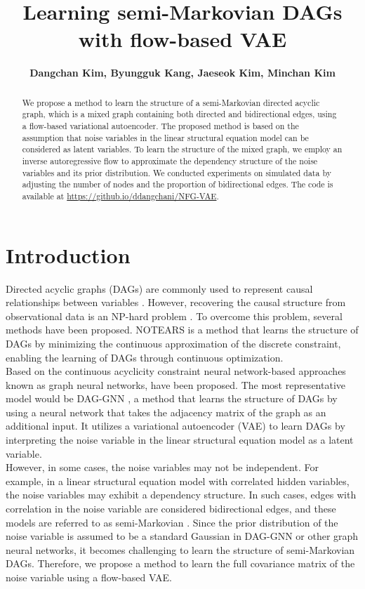 \documentclass[10pt]{article}
\title{
\textbf{Learning semi-Markovian DAGs with flow-based VAE}}
\author{\normalsize\bfseries Dangchan Kim, Byungguk Kang, Jaeseok Kim, Minchan Kim}
\begin{document}
\maketitle

\begin{abstract}
    We propose a method to learn the structure of a semi-Markovian directed acyclic graph, which is a mixed graph containing both directed and bidirectional edges, using a flow-based variational autoencoder. The proposed method is based on the assumption that noise variables in the linear structural equation model can be considered as latent variables. To learn the structure of the mixed graph, we employ an inverse autoregressive flow to approximate the dependency structure of the noise variables and its prior distribution. We conducted experiments on simulated data by adjusting the number of nodes and the proportion of bidirectional edges. The code is available at \url{https://github.io/ddangchani/NFG-VAE}.
\end{abstract}

\section{Introduction}

Directed acyclic graphs (DAGs) are commonly used to represent causal relationships between variables \cite{pearl_2009}. However, recovering the causal structure from observational data is an NP-hard problem \cite{ChickeringNPhard}. To overcome this problem, several methods have been proposed. NOTEARS \cite{zheng2018dags} is a method that learns the structure of DAGs by minimizing the continuous approximation of the discrete constraint, enabling the learning of DAGs through continuous optimization.\\

Based on the continuous acyclicity constraint neural network-based approaches known as graph neural networks, have been proposed. \cite{yu2019daggnn,li2020dirichlet,kipf2016variational,zhang2019dvae} The most representative model would be DAG-GNN \cite{yu2019daggnn}, a method that learns the structure of DAGs by using a neural network that takes the adjacency matrix of the graph as an additional input. It utilizes a variational autoencoder (VAE) to learn DAGs by interpreting the noise variable in the linear structural equation model as a latent variable.\\

However, in some cases, the noise variables may not be independent. For example, in a linear structural equation model with correlated hidden variables, the noise variables may exhibit a dependency structure. In such cases, edges with correlation in the noise variable are considered bidirectional edges, and these models are referred to as semi-Markovian \cite{Shipster2006semimarkovian}. Since the prior distribution of the noise variable is assumed to be a standard Gaussian in DAG-GNN or other graph neural networks, it becomes challenging to learn the structure of semi-Markovian DAGs. Therefore, we propose a method to learn the full covariance matrix of the noise variable using a flow-based VAE.
\end{document}
